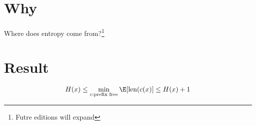 
\section*{Why}

Where does entropy come from?\footnote{Futre editions will expand}

\section*{Result}

\[
H(x) \leq \min_{c: \text{prefix free}} \E [\text{len}(c(x)] \leq H(x) + 1
\]
\blankpage